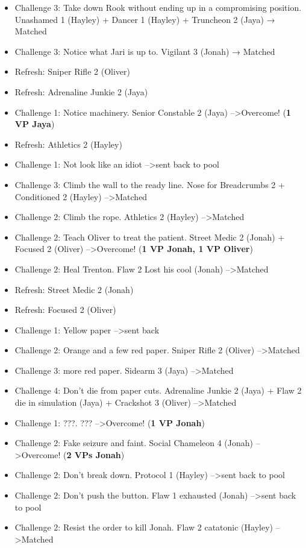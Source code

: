 \begin{itemize}
\item Challenge 3: Take down Rook without ending up in a compromising position.  Unashamed 1 (Hayley) + Dancer 1 (Hayley) + Truncheon 2 (Jaya) → Matched
\item Challenge 3: Notice what Jari is up to.  Vigilant 3 (Jonah) → Matched
\item Refresh: Sniper Rifle 2 (Oliver)
\item Refresh: Adrenaline Junkie 2 (Jaya)
\item Challenge 1: Notice machinery.  Senior Constable 2 (Jaya)  --\textgreater  Overcome! (\textbf{1 VP Jaya})
\item Refresh: Athletics 2 (Hayley)
\item Challenge 1: Not look like an idiot --\textgreater  sent back to pool
\item Challenge 3: Climb the wall to the ready line. Nose for Breadcrumbs 2 + Conditioned 2 (Hayley) --\textgreater  Matched
\item Challenge 2: Climb the rope. Athletics 2 (Hayley) --\textgreater  Matched
\item Challenge 2: Teach Oliver to treat the patient.  Street Medic 2 (Jonah) + Focused 2 (Oliver) --\textgreater  Overcome! (\textbf{1 VP Jonah, 1 VP Oliver})
\item Challenge 2: Heal Trenton.   {\color[RGB]{255,0,0}Flaw 2 Lost his cool (Jonah)}  --\textgreater  Matched
\item Refresh: Street Medic 2 (Jonah)
\item Refresh: Focused 2 (Oliver)
\item Challenge 1: Yellow paper --\textgreater  sent back
\item Challenge 2: Orange and a few red paper.  Sniper Rifle 2 (Oliver)  --\textgreater  Matched
\item Challenge 3: more red paper.  Sidearm 3 (Jaya) --\textgreater  Matched
\item Challenge 4: Don't die from paper cuts.  Adrenaline Junkie 2 (Jaya) +  {\color[RGB]{255,0,0}Flaw 2 die in simulation (Jaya)}  + Crackshot 3 (Oliver) --\textgreater  Matched
\item Challenge 1: ???.  ???  --\textgreater  Overcome! (\textbf{1 VP Jonah})
\item Challenge 2: Fake seizure and faint.  Social Chameleon 4 (Jonah) --\textgreater  Overcome! (\textbf{2 VPs Jonah})
\item Challenge 2: Don't break down.  Protocol 1 (Hayley) --\textgreater  sent back to pool
\item Challenge 2: Don't push the button.   {\color[RGB]{255,0,0}Flaw 1 exhausted (Jonah)}  --\textgreater  sent back to pool
\item Challenge 2: Resist the order to kill Jonah.   {\color[RGB]{255,0,0}Flaw 2 catatonic (Hayley)}  --\textgreater  Matched 
\end{itemize}




